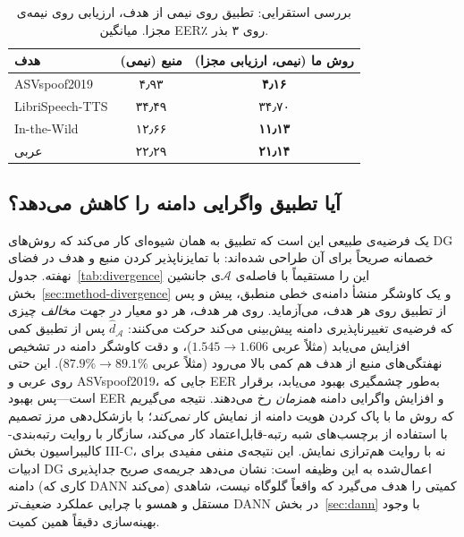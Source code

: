 \documentclass[a4paper,11pt]{article}
\begin{document}
\begin{table}[t]
\centering
\caption{بررسی استقرایی: تطبیق روی نیمی از هدف، ارزیابی روی نیمه‌ی مجزا.
میانگین EER٪ روی ۳ بذر.}
\label{tab:inductive}
\begin{tabular}{@{}lcc@{}}
\toprule
هدف & منبع (نیمی) & روش ما (نیمی، ارزیابی مجزا) \\
\midrule
ASVspoof2019 & ۴٫۹۳ & \textbf{۴٫۱۶} \\
LibriSpeech-TTS & ۳۴٫۴۹ & ۳۴٫۷۰ \\
In-the-Wild & ۱۲٫۶۶ & \textbf{۱۱٫۱۳} \\
عربی & ۲۲٫۲۹ & \textbf{۲۱٫۱۴} \\
\bottomrule
\end{tabular}
\end{table}

\subsection{آیا تطبیق واگرایی دامنه را کاهش می‌دهد؟}
\label{sec:divergence}
یک فرضیه‌ی طبیعی این است که تطبیق به همان شیوه‌ای کار می‌کند که روش‌های DG
خصمانه صریحاً برای آن طراحی شده‌اند: با تمایزناپذیر کردن منبع و هدف در فضای
نهفته. جدول~\ref{tab:divergence} این را مستقیماً با فاصله‌ی $\mathcal{A}$ی
جانشین بخش~\ref{sec:method-divergence} و یک کاوشگر منشأ دامنه‌ی خطی منطبق،
پیش و پس از تطبیق روی هر هدف، می‌آزماید. روی \emph{هر} هدف، هر دو معیار در
جهت \emph{مخالف} چیزی که فرضیه‌ی تغییرناپذیری دامنه پیش‌بینی می‌کند حرکت
می‌کنند: $\hat d_{\mathcal{A}}$ پس از تطبیق کمی افزایش می‌یابد (مثلاً عربی
$1.545\!\to\!1.606$)، و دقت کاوشگر دامنه در تشخیص نهفتگی‌های منبع از هدف هم
کمی بالا می‌رود (مثلاً عربی $87.9\%\!\to\!89.1\%$). این حتی روی عربی و
ASVspoof2019، جایی که EER به‌طور چشمگیری بهبود می‌یابد، برقرار است---پس
بهبود EER و افزایش واگرایی دامنه \emph{همزمان} رخ می‌دهند. نتیجه می‌گیریم
که روش ما با پاک کردن هویت دامنه از نمایش کار \emph{نمی‌کند}؛ با
بازشکل‌دهی مرز تصمیم با استفاده از برچسب‌های شبه رتبه-قابل‌اعتماد کار
می‌کند، سازگار با روایت رتبه‌بندی-کالیبراسیون بخش III-C، نه با روایت
هم‌ترازی نمایش. این نتیجه‌ی منفی مفیدی برای ادبیات DG اعمال‌شده به این
وظیفه است: نشان می‌دهد جریمه‌ی صریح جداپذیری دامنه (کاری که DANN می‌کند)
کمیتی را هدف می‌گیرد که واقعاً گلوگاه نیست، شاهدی مستقل و همسو با چرایی
عملکرد ضعیف‌تر DANN در بخش~\ref{sec:dann} با وجود بهینه‌سازی دقیقاً همین
کمیت.
\end{document}
